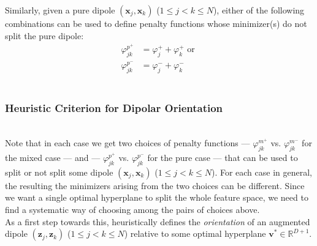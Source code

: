 \documentclass[12pt]{amsart}
\theoremstyle{definition}
\theoremstyle{plain}
\theoremstyle{remark}
\newcommand{\RR}{\mathbb{R}}
\begin{document}
Similarly, given a pure dipole $(\mathbf{x}_j, \mathbf{x}_k)$ ($1 \leq j < k \leq N$), either of the following combinations can be used to define penalty functions whose minimizer(s) do not split the pure dipole:
\begin{align*}
	\varphi^{p^+}_{jk} &= \varphi^+_j + \varphi^+_k \text{ or } \\
	\varphi^{p^-}_{jk} &= \varphi^-_j + \varphi^-_k
\end{align*} \\


\subsubsection{Heuristic Criterion for Dipolar Orientation} \hfill \\


Note that in each case we get two choices of penalty functions --- $\varphi^{m^+}_{jk}$ vs. $\varphi^{m^-}_{jk}$ for the mixed case --- and --- $\varphi^{p^+}_{jk}$ vs. $\varphi^{p^-}_{jk}$ for the pure case --- that can be used to split or not split some dipole $(\mathbf{x}_j, \mathbf{x}_k)$ ($1 \leq j < k \leq N$). For each case in general, the resulting the minimizers arising from the two choices can be different. Since we want a single optimal hyperplane to split the whole feature space, we need to find a systematic way of choosing among the pairs of choices above. \\

As a first step towards this, \cite{kretowska} heuristically defines the \emph{orientation} of an augmented dipole $(\mathbf{z}_j, \mathbf{z}_k)$ ($1 \leq j < k \leq N$) relative to some optimal hyperplane $\mathbf{v}^\ast \in \RR^{D + 1}$.
\end{document}
